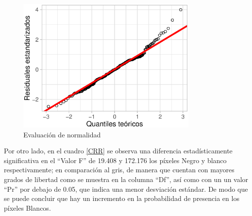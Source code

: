 \documentclass[12pt, letterpaper] {article}
\begin{document}
\begin{figure}[H]
\centering\includegraphics[width=90mm]{TEvalnorm.eps}
\caption{Evaluación de normalidad}
\label{PSQT}
\end{figure}

Por otro lado, en el cuadro \ref{CRR} se observa una diferencia estadísticamente significativa en el ``Valor F'' de 19.408 y 172.176 los píxeles Negro y blanco respectivamente; en comparación al gris, de manera que cuentan con mayores grados de libertad como se muestra en la columna  ``Df'', así como con un un valor  ``Pr'' por debajo de 0.05, que indica una menor desviación estándar. De modo que se puede concluir que hay un incremento en la probabilidad de presencia en los píxeles Blancos. 
\end{document}
